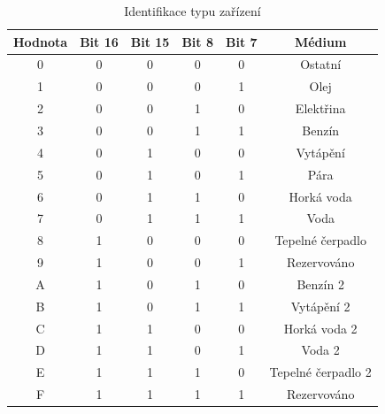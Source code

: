 			\begin{table}[!ht]
			\centering
			\vspace{-30pt}
			\caption{Identifikace typu zařízení}
			\label{def_device_type_identification}
			\begin{tabular}{|c|c|c|c|c|c|}
			\hline
			\textbf{Hodnota} & \textbf{Bit 16}   & \textbf{Bit 15}   & \textbf{Bit 8}   & \textbf{Bit 7}  & \textbf{Médium  }                      \\ \hline\hline
			0           & 0        & 0        & 0       & 0      & Ostatní                   \\ \hline
			1           & 0        & 0        & 0       & 1      & Olej                     \\ \hline
			2           & 0        & 0        & 1       & 0      & Elektřina             \\ \hline
			3           & 0        & 0        & 1       & 1      & Benzín                     \\ \hline
			4           & 0        & 1        & 0       & 0      & Vytápění                    \\ \hline
			5           & 0        & 1        & 0       & 1      & Pára                   \\ \hline
			6           & 0        & 1        & 1       & 0      & Horká voda               \\ \hline
			7           & 0        & 1        & 1       & 1      & Voda                   \\ \hline
			8           & 1        & 0        & 0       & 0      & Tepelné čerpadlo                \\ \hline
			9           & 1        & 0        & 0       & 1      & Rezervováno                \\ \hline
			A           & 1        & 0        & 1       & 0      & Benzín 2              \\ \hline
			B           & 1        & 0        & 1       & 1      & Vytápění 2             \\ \hline
			C           & 1        & 1        & 0       & 0      & Horká voda 2        \\ \hline
			D           & 1        & 1        & 0       & 1      & Voda 2            \\ \hline
			E           & 1        & 1        & 1       & 0      & Tepelné čerpadlo 2           \\ \hline
			F           & 1        & 1        & 1       & 1      & Rezervováno                 \\ \hline\hline
			\end{tabular}
			\vspace{-5pt}
			\end{table}


